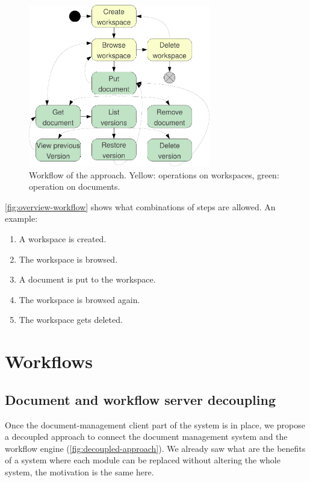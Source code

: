 \begin{figure}[H]
\centering
\includegraphics[width=300px,keepaspectratio]{overview-workflow.pdf}
\caption{Workflow of the approach. Yellow: operations on workspaces, green: operation on documents.}
\label{fig:overview-workflow}
\end{figure}

\autoref{fig:overview-workflow} shows what combinations of steps are allowed. An example:

\begin{enumerate}
\item A workspace is created.
\item The workspace is browsed.
\item A document is put to the workspace.
\item The workspace is browsed again.
\item The workspace gets deleted.
\end{enumerate}

\section{Workflows}

\subsection*{Document and workflow server decoupling}

Once the document-management client part of the system is in place, we propose
a decoupled approach to connect the document management system and the workflow
engine (\autoref{fig:decoupled-approach}). We already saw what are the
benefits of a system where each module can be replaced without altering the
whole system, the motivation is the same here.

